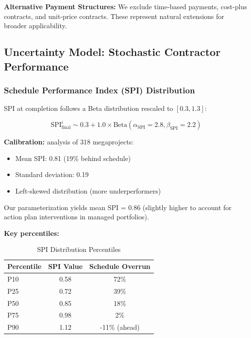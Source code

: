 \textbf{Alternative Payment Structures:} We exclude time-based payments, cost-plus contracts, and unit-price contracts. These represent natural extensions for broader applicability.

\subsection{Uncertainty Model: Stochastic Contractor Performance}

\subsubsection{Schedule Performance Index (SPI) Distribution}

SPI at completion follows a Beta distribution rescaled to $[0.3, 1.3]$:

\begin{equation}
\text{SPI}_{\text{final}}^i \sim 0.3 + 1.0 \times \text{Beta}(\alpha_{\text{SPI}} = 2.8, \beta_{\text{SPI}} = 2.2)
\end{equation}

\textbf{Calibration:} \citet{merrow2011industrial} analysis of 318 megaprojects:
\begin{itemize}
    \item Mean SPI: 0.81 (19\% behind schedule)
    \item Standard deviation: 0.19
    \item Left-skewed distribution (more underperformers)
\end{itemize}

Our parameterization yields mean SPI = 0.86 (slightly higher to account for action plan interventions in managed portfolios).

\textbf{Key percentiles:}

\begin{table}[h]
\centering
\small
\caption{SPI Distribution Percentiles}
\label{tab:spi_dist}
\begin{tabular}{@{}lcc@{}}
\toprule
Percentile & SPI Value & Schedule Overrun \\
\midrule
P10 & 0.58 & 72\% \\
P25 & 0.72 & 39\% \\
P50 & 0.85 & 18\% \\
P75 & 0.98 & 2\% \\
P90 & 1.12 & -11\% (ahead) \\
\bottomrule
\end{tabular}
\end{table}

